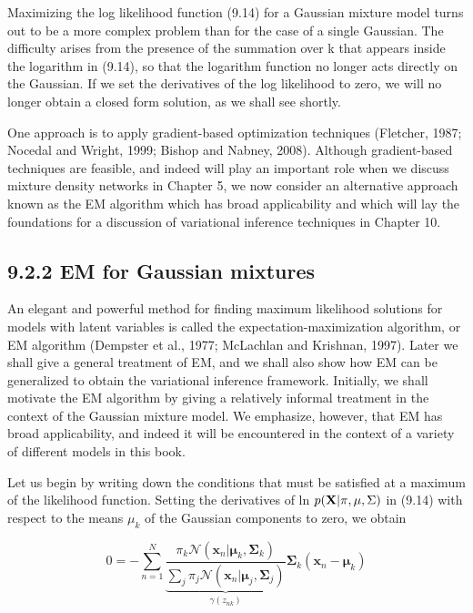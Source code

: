 \documentclass[
  10
]{article}
\begin{document}
Maximizing the log likelihood function (9.14) for a Gaussian mixture
model turns out to be a more complex problem than for the case of a
single Gaussian. The difficulty arises from the presence of the
summation over k that appears inside the logarithm in (9.14), so that
the logarithm function no longer acts directly on the Gaussian. If we
set the derivatives of the log likelihood to zero, we will no longer
obtain a closed form solution, as we shall see shortly.

One approach is to apply gradient-based optimization techniques
(Fletcher, 1987; Nocedal and Wright, 1999; Bishop and Nabney, 2008).
Although gradient-based techniques are feasible, and indeed will play an
important role when we discuss mixture density networks in Chapter 5, we
now consider an alternative approach known as the EM algorithm which has
broad applicability and which will lay the foundations for a discussion
of variational inference techniques in Chapter 10.

\subsection{9.2.2 EM for Gaussian
mixtures}\label{em-for-gaussian-mixtures}

An elegant and powerful method for finding maximum likelihood solutions
for models with latent variables is called the expectation-maximization
algorithm, or EM algorithm (Dempster et al., 1977; McLachlan and
Krishnan, 1997). Later we shall give a general treatment of EM, and we
shall also show how EM can be generalized to obtain the variational
inference framework. Initially, we shall motivate the EM algorithm by
giving a relatively informal treatment in the context of the Gaussian
mixture model. We emphasize, however, that EM has broad applicability,
and indeed it will be encountered in the context of a variety of
different models in this book.

Let us begin by writing down the conditions that must be satisfied at a
maximum of the likelihood function. Setting the derivatives of ln
\(p ( { \bf X } | \pi , \mu , \Sigma )\) in (9.14) with respect to the
means \(\mu _ { k }\) of the Gaussian components to zero, we obtain

\[
0 = - \sum_ {n = 1} ^ {N} \underbrace {\frac {\pi_ {k} \mathcal {N} (\mathbf {x} _ {n} | \boldsymbol {\mu} _ {k} , \boldsymbol {\Sigma} _ {k})}{\sum_ {j} \pi_ {j} \mathcal {N} (\mathbf {x} _ {n} | \boldsymbol {\mu} _ {j} , \boldsymbol {\Sigma} _ {j})}} _ {\gamma (z _ {n k})} \boldsymbol {\Sigma} _ {k} (\mathbf {x} _ {n} - \boldsymbol {\mu} _ {k})\tag{9.16}
\]
\end{document}
